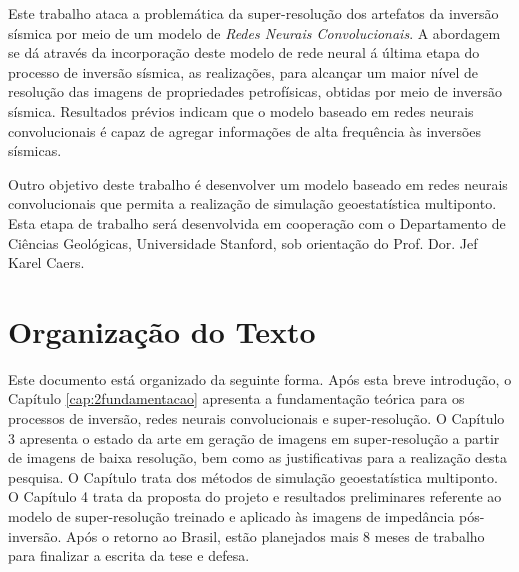 Este trabalho ataca a problemática da super-resolução dos artefatos da inversão sísmica
por meio de um modelo de \textit{Redes Neurais Convolucionais}.
A abordagem se dá através da incorporação deste modelo de rede neural á última
etapa do processo de inversão sísmica, as realizações, para alcançar um maior nível de
resolução das imagens de propriedades petrofísicas, obtidas por meio de inversão sísmica.
Resultados prévios indicam que o modelo baseado em redes neurais convolucionais é capaz
de agregar informações de alta frequência às inversões sísmicas.

Outro objetivo deste trabalho é desenvolver um modelo baseado em redes neurais convolucionais que permita a
realização de simulação geoestatística multiponto. Esta etapa de trabalho será desenvolvida
em cooperação com o Departamento de Ciências Geológicas, Universidade Stanford, sob
orientação do Prof. Dor. Jef Karel Caers.


\section{Organização do Texto}

Este documento está organizado da seguinte forma. Após esta breve introdução, o
Capítulo \ref{cap:2fundamentacao} apresenta a fundamentação teórica para os
processos de inversão, redes neurais 
convolucionais e super-resolução. O Capítulo 3 %
apresenta o estado da arte 
em geração de imagens em super-resolução a partir de imagens de baixa resolução, bem como as justificativas 
para a realização desta pesquisa.
O Capítulo trata dos métodos de simulação geoestatística multiponto.
O Capítulo 4 %
trata da proposta do projeto e resultados 
preliminares referente ao modelo de super-resolução treinado e aplicado às imagens 
de impedância pós-inversão. Após o retorno ao Brasil, estão planejados mais 8 meses 
de trabalho para finalizar a escrita da tese e defesa.
